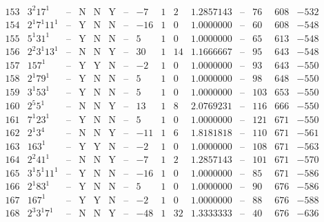 \documentclass[11pt,reqno,a4letter]{article}
\numberwithin{figure}{section}
\numberwithin{table}{section}
\theoremstyle{plain}
\numberwithin{theorem}{section}
\theoremstyle{definition}
\begin{document}
\begin{table}[h!]
\begin{equation*}
{\begin{array}{|cc|c|ccc|c|c|ccc|c|ccc}
 153 & 3^2 17^1 & \text{--} & \text{N} & \text{N} & \text{Y} & \text{--} & -7 & 1 & 2 & 1.2857143 & \text{--} & 76 & 608 & -532 \\
 154 & 2^1 7^1 11^1 & \text{--} & \text{Y} & \text{N} & \text{N} & \text{--} & -16 & 1 & 0 & 1.0000000 & \text{--} & 60 & 608 & -548 \\
 155 & 5^1 31^1 & \text{--} & \text{Y} & \text{N} & \text{N} & \text{--} & 5 & 1 & 0 & 1.0000000 & \text{--} & 65 & 613 & -548 \\
 156 & 2^2 3^1 13^1 & \text{--} & \text{N} & \text{N} & \text{Y} & \text{--} & 30 & 1 & 14 & 1.1666667 & \text{--} & 95 & 643 & -548 \\
 157 & 157^1 & \text{--} & \text{Y} & \text{Y} & \text{N} & \text{--} & -2 & 1 & 0 & 1.0000000 & \text{--} & 93 & 643 & -550 \\
 158 & 2^1 79^1 & \text{--} & \text{Y} & \text{N} & \text{N} & \text{--} & 5 & 1 & 0 & 1.0000000 & \text{--} & 98 & 648 & -550 \\
 159 & 3^1 53^1 & \text{--} & \text{Y} & \text{N} & \text{N} & \text{--} & 5 & 1 & 0 & 1.0000000 & \text{--} & 103 & 653 & -550 \\
 160 & 2^5 5^1 & \text{--} & \text{N} & \text{N} & \text{Y} & \text{--} & 13 & 1 & 8 & 2.0769231 & \text{--} & 116 & 666 & -550 \\
 161 & 7^1 23^1 & \text{--} & \text{Y} & \text{N} & \text{N} & \text{--} & 5 & 1 & 0 & 1.0000000 & \text{--} & 121 & 671 & -550 \\
 162 & 2^1 3^4 & \text{--} & \text{N} & \text{N} & \text{Y} & \text{--} & -11 & 1 & 6 & 1.8181818 & \text{--} & 110 & 671 & -561 \\
 163 & 163^1 & \text{--} & \text{Y} & \text{Y} & \text{N} & \text{--} & -2 & 1 & 0 & 1.0000000 & \text{--} & 108 & 671 & -563 \\
 164 & 2^2 41^1 & \text{--} & \text{N} & \text{N} & \text{Y} & \text{--} & -7 & 1 & 2 & 1.2857143 & \text{--} & 101 & 671 & -570 \\
 165 & 3^1 5^1 11^1 & \text{--} & \text{Y} & \text{N} & \text{N} & \text{--} & -16 & 1 & 0 & 1.0000000 & \text{--} & 85 & 671 & -586 \\
 166 & 2^1 83^1 & \text{--} & \text{Y} & \text{N} & \text{N} & \text{--} & 5 & 1 & 0 & 1.0000000 & \text{--} & 90 & 676 & -586 \\
 167 & 167^1 & \text{--} & \text{Y} & \text{Y} & \text{N} & \text{--} & -2 & 1 & 0 & 1.0000000 & \text{--} & 88 & 676 & -588 \\
 168 & 2^3 3^1 7^1 & \text{--} & \text{N} & \text{N} & \text{Y} & \text{--} & -48 & 1 & 32 & 1.3333333 & \text{--} & 40 & 676 & -636 \\

\end{array}}
\end{equation*}
\end{table}
\end{document}

